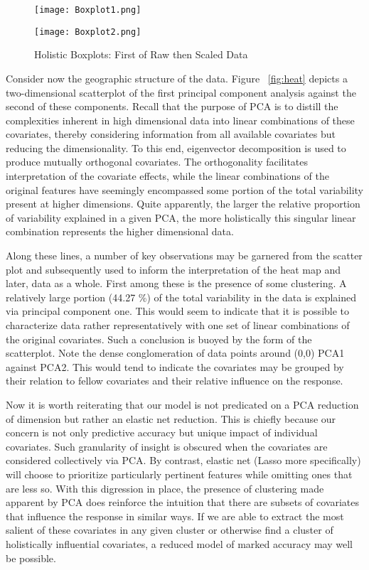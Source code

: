 \documentclass[11pt]{article}
\begin{document}
\begin{figure}[htbp]
\centering
\begin{minipage}{.5\textwidth}
	\centering
	\texttt{[image: Boxplot1.png]}
\end{minipage}%
\begin{minipage}{.5\textwidth}
	\centering
	\texttt{[image: Boxplot2.png]}
\end{minipage}%
\caption{Holistic Boxplots: First of Raw then Scaled Data}\label{fig:box}
\end{figure}
	
	
	Consider now the geographic structure of the data.  Figure ~\ref{fig:heat} depicts a two-dimensional scatterplot of the first principal component analysis against the second of these components.  Recall that the purpose of PCA is to distill the complexities inherent in high dimensional data into linear combinations of these covariates, thereby considering information from all available covariates but reducing the dimensionality.  To this end, eigenvector decomposition is used to produce mutually orthogonal covariates.  The orthogonality facilitates interpretation of the covariate effects, while the linear combinations of the original features have seemingly encompassed some portion of the total variability present at higher dimensions.  Quite apparently, the larger the relative proportion of variability explained in a given PCA, the more holistically this singular linear combination represents the higher dimensional data.  
	
	Along these lines, a number of key observations may be garnered from the scatter plot and subsequently used to inform the interpretation of the heat map and later, data as a whole.  First among these is the presence of some clustering.  A relatively large portion (44.27 \%) of the total variability in the data is explained via principal component one.  This would seem to indicate that it is possible to characterize data rather representatively with one set of linear combinations of the original covariates.  Such a conclusion is buoyed by the form of the scatterplot.  Note the dense conglomeration of data points around (0,0) PCA1 against PCA2.  This would tend to indicate the covariates may be grouped by their relation to fellow covariates and their relative influence on the response.  
	
	Now it is worth reiterating that our model is not predicated on a PCA reduction of dimension but rather an elastic net reduction.  This is chiefly because our concern is not only predictive accuracy but unique impact of individual covariates.  Such granularity of insight is obscured when the covariates are considered collectively via PCA.  By contrast, elastic net (Lasso more specifically) will choose to prioritize particularly pertinent features while omitting ones that are less so.  With this digression in place, the presence of clustering made apparent by PCA does reinforce the intuition that there are subsets of covariates that influence the response in similar ways.  If we are able to extract the most salient of these covariates in any given cluster or otherwise find a cluster of holistically influential covariates, a reduced model of marked accuracy may well be possible.  
	
\end{document}
